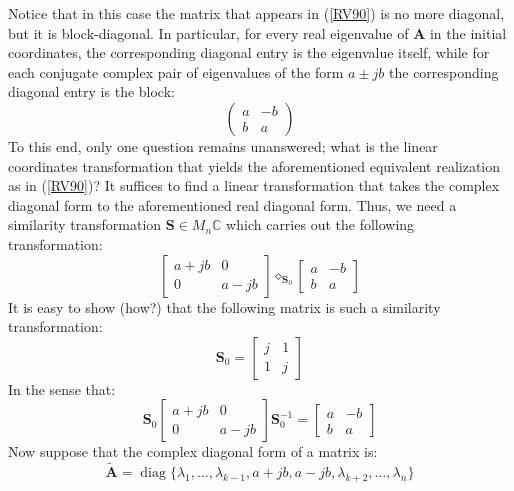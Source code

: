 \documentclass[a4paper,10pt,oneside]{book}
\begin{document}
Notice that in this case the matrix that appears in (\ref{RV90}) is no more diagonal, but it is block-diagonal. In particular, for every real eigenvalue of $\mathbf{A}$ in the initial coordinates, the corresponding diagonal entry is the eigenvalue itself, while for each conjugate complex pair of eigenvalues of the form $a\pm jb$ the corresponding diagonal entry is the block:
\begin{equation}
 \left( {\begin{array}{cc} a &-b\\b&a \end{array} } \right)
\end{equation}
To this end, only one question remains unanswered; what is the linear coordinates transformation that yields the aforementioned equivalent realization as in (\ref{RV90})? It suffices to find a linear transformation that takes the complex diagonal form to the aforementioned real diagonal form. Thus, we need a similarity transformation $\mathbf{S}\in M_n{\mathbb{C}}$ which carries out the following transformation:
\begin{equation}
 \left[ {\begin{array}{cc} a+jb & 0\\ 0 & a-jb \end{array} } \right] \diamond_{\mathbf{S}_0} \left[ {\begin{array}{cc} a & -b\\ b & a \end{array} } \right]
\end{equation}
It is easy to show (how?) that the following matrix is such a similarity transformation:
\begin{equation}
 \mathbf{S}_0=\left[ {\begin{array}{cc} j & 1\\ 1 & j \end{array} } \right] 
\end{equation}
In the sense that:
\begin{equation}
 \mathbf{S}_0 \left[ {\begin{array}{cc} a+jb & 0\\ 0 & a-jb \end{array} } \right] \mathbf{S}_0^{-1}= \left[ {\begin{array}{cc} a & -b\\ b & a \end{array} } \right]
\end{equation}
Now suppose that the complex diagonal form of a matrix is:
\begin{equation}
 \tilde{\mathbf{A}}=\operatorname{diag}\{\lambda_1,\ldots,\lambda_{k-1},a+jb,a-jb,\lambda_{k+2},\ldots,\lambda_n\}
\end{equation}
\end{document}
